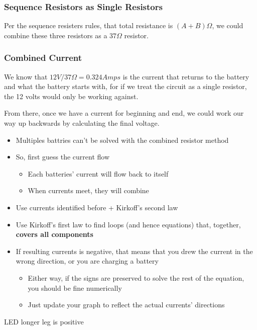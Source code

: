 \documentclass[letterpaper]{article}
\begin{document}
\subsubsection{Sequence Resistors as Single Resistors}
\label{sec:org954aaeb}
Per the sequence resisters rules, that total resistance is
\((A+B)\Omega\), we could combine these three resistors as a
\(37 \Omega\) resistor.

\subsubsection{Combined Current}
\label{sec:org06eafa0}
We know that \(12V / 37\Omega = 0.324 Amps\) is the current that returns
to the battery and what the battery starts with, for if we treat the
circuit as a single resistor, the 12 volts would only be working
against.

From there, once we have a current for beginning and end, we could work
our way up backwards by calculating the final voltage.

\begin{itemize}
\item Multiples battries can't be solved with the combined resistor method
\item So, first guess the current flow

\begin{itemize}
\item Each batteries' current will flow back to itself
\item When currents meet, they will combine
\end{itemize}

\item Use currents identified before + Kirkoff's second law
\item Use Kirkoff's first law to find loops (and hence equations) that,
together, \textbf{covers all components}
\item If resulting currents is negative, that means that you drew the
current in the wrong direction, or you are charging a battery

\begin{itemize}
\item Either way, if the signs are preserved to solve the rest of the
equation, you should be fine numerically
\item Just update your graph to reflect the actual currents' directions
\end{itemize}
\end{itemize}

LED longer leg is positive
\end{document}

